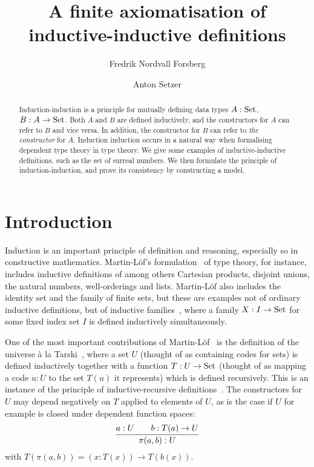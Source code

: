 \documentclass{article}
\title{A finite axiomatisation of inductive-inductive definitions}
\author{Fredrik Nordvall Forsberg}
\author{Anton Setzer}
\affil{Swansea University \\
Singleton  Park \\
Swansea SA2 8PP, UK}
\begin{document}
\maketitle

\begin{abstract}  \noindent %
  Induction-induction is a principle for mutually defining data types
  $A : \text{Set}$, $B : A \to \text{Set}$. Both $A$ and $B$ are defined
  inductively, and the constructors for $A$ can refer to $B$ and vice
  versa. In addition, the constructor for $B$ can refer to \emph{the
    constructor} for $A$. Induction induction occurs in a natural way
  when formalising dependent type theory in type theory.  We give some
  examples of inductive-inductive definitions, such as the set of
  surreal numbers. We then formulate the principle of
  induction-induction, and prove its consistency by constructing a
  model.
\end{abstract}

\section{Introduction} %
\label{sec:introduction}


Induction is an important principle of definition and reasoning,
especially so in constructive mathematics.  Martin-L\"of's
formulation~\cite{martinlof1984bibliopolis} of type theory, for
instance, includes inductive definitions of among others Cartesian
products, disjoint unions, the natural numbers, well-orderings and
lists. Martin-L\"of also includes the identity set and the family of
finite sets, but these are examples not of ordinary inductive
definitions, but of inductive families~\cite{dybjer1994indfam}, where
a family $X : I \to \text{Set}$ for some fixed index set $I$ is defined
inductively simultaneously.

One of the most important contributions of
Martin-L\"of~\cite{martinlof1984bibliopolis} is the definition of the
universe \`a la Tarski~\cite{palmgren1998twentyfiveyears}, where a set
$U$ (thought of as containing codes for sets) is defined inductively
together with a function $T : U \to \text{Set}$ (thought of as mapping a
code $u : U$ to the set $T(u)$ it represents) which is defined
recursively. This is an instance of the principle of
inductive-recursive definitions~\cite{dybjer2000IR}. The constructors
for $U$ may depend negatively on $T$ applied to elements of $U$, as is
the case if $U$ for example is closed under dependent function spaces:
\[
\infer{\pi(a, b) : U}{a : U & \quad b : T(a) \to U}
\]
with $T(\pi(a, b)) = (x : T(x)) \to T(b(x))$.
\end{document}
